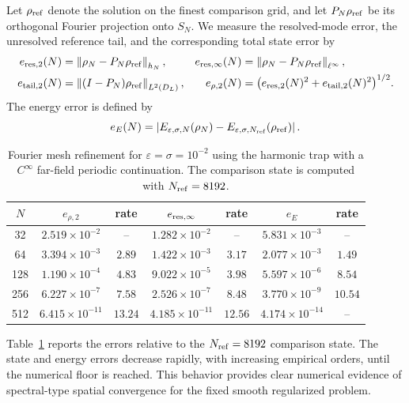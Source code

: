 \documentclass[11pt]{article}
\newcommand{\SN}{S_N}
\newcommand{\eps}{\varepsilon}
\newcommand{\sig}{\sigma}
\newcommand{\norm}[1]{\left\|#1\right\|}
\newcommand{\abs}[1]{\left|#1\right|}
\theoremstyle{plain}
\theoremstyle{definition}
\numberwithin{equation}{section}
\begin{document}
Let $\rho_{\rm ref}$ denote the solution on the finest comparison
grid, and let $P_N\rho_{\rm ref}$ be its orthogonal Fourier projection
onto $\SN$. We measure the resolved-mode error, the unresolved
reference tail, and the corresponding total state error by
\begin{equation}
\label{eq:spatial-errors}
\begin{aligned}
e_{\rm res,2}(N)
&=
\norm{\rho_N-P_N\rho_{\rm ref}}_{h_N},
&
e_{\rm res,\infty}(N)
&=
\norm{\rho_N-P_N\rho_{\rm ref}}_{\ell^\infty},
\\
e_{\rm tail,2}(N)
&=
\norm{(I-P_N)\rho_{\rm ref}}_{L^2(D_L)},
&
e_{\rho,2}(N)
&=
\bigl(
e_{\rm res,2}(N)^2+e_{\rm tail,2}(N)^2
\bigr)^{1/2}.
\end{aligned}
\end{equation}
The energy error is defined by
\begin{equation}
\label{eq:spatial-energy-error}
e_E(N)
=
\abs{
E_{\eps,\sig,N}(\rho_N)
-
E_{\eps,\sig,N_{\rm ref}}(\rho_{\rm ref})
}.
\end{equation}



\begin{table}[t]
\centering
\small
\caption{
Fourier mesh refinement for $\eps=\sig=10^{-2}$ using the harmonic
trap with a $C^\infty$ far-field periodic continuation.
The comparison state is computed with $N_{\rm ref}=8192$.
}
\label{tab:mesh}
\begin{tabular}{ccccccc}
\toprule
$N$
&
$e_{\rho,2}$
&
rate
&
$e_{\rm res,\infty}$
&
rate
&
$e_E$
&
rate
\\
\midrule
32
& $2.519\times10^{-2}$
& --
& $1.282\times10^{-2}$
& --
& $5.831\times10^{-3}$
& --
\\
64
& $3.394\times10^{-3}$
& $2.89$
& $1.422\times10^{-3}$
& $3.17$
& $2.077\times10^{-3}$
& $1.49$
\\
128
& $1.190\times10^{-4}$
& $4.83$
& $9.022\times10^{-5}$
& $3.98$
& $5.597\times10^{-6}$
& $8.54$
\\
256
& $6.227\times10^{-7}$
& $7.58$
& $2.526\times10^{-7}$
& $8.48$
& $3.770\times10^{-9}$
& $10.54$
\\
512
& $6.415\times10^{-11}$
& $13.24$
& $4.185\times10^{-11}$
& $12.56$
& $4.174\times10^{-14}$
& --
\\
\bottomrule
\end{tabular}
\end{table}

Table~\ref{tab:mesh} reports the errors relative to the
$N_{\rm ref}=8192$ comparison state. The state and energy errors
decrease rapidly, with increasing empirical orders, until the
numerical floor is reached. This behavior provides clear numerical
evidence of spectral-type spatial convergence for the fixed smooth
regularized problem.
\end{document}
